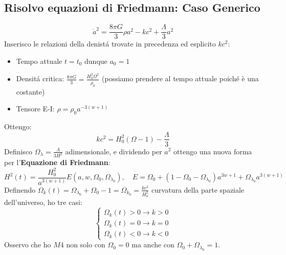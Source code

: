 \documentclass[12pt, a4paper]{article}
\begin{document}
\subsection{Risolvo equazioni di Friedmann: Caso Generico}
\begin{equation}
    \dot{a}^2 = \frac{8 \pi G}{3} \rho a^2 - kc^2 + \frac{\Lambda}{3} a^2
\end{equation}
Inserisco le relazioni della denist\'{a} trovate in precedenza ed esplicito $kc^2$:
\begin{itemize}
    \item Tempo attuale $t=t_0$ dunque $a_0=1$
    \item Densit\'{a} critica: $\frac{8 \pi G}{3}=\frac{H_0^2 \Omega^2}{\rho_0}$ (possiamo prendere al tempo attuale poich\'{e} è una costante)
    \item Tensore E-I: $\rho=\rho_0 a^{-3(w+1)}$
\end{itemize}
Ottengo:
\begin{equation}
    kc^2=H_0^2(\Omega - 1)-\frac{\Lambda}{3}
\end{equation}
Definisco $\Omega_{\lambda}=\frac{\Lambda}{3 H^2}$ adimensionale, e dividendo per $a^2$ ottengo una nuova forma per l'\textbf{Equazione di Friedmann}:
\begin{equation}
    H^2(t)=\frac{H_0^2}{a^{3(w+1)}}E(a,w,\Omega_0, \Omega_{\lambda_0}), \quad E=\Omega_0+(1-\Omega_0-\Omega_{\lambda_0})a^{3w+1}+\Omega_{\lambda_0}a^{3(w+1)}
\end{equation}
Definendo $\Omega_k(t)=\Omega_{\lambda_0} + \Omega_0 -1=\Omega_{k_0}=\frac{kc^2}{H_0^2}$ curvatura della parte spaziale dell'universo, ho tre casi:
\begin{equation}
  \begin{cases}
         \Omega_k(t)>0 \rightarrow k>0
         \\
         \Omega_k(t)=0 \rightarrow k=0
         \\
         \Omega_k(t)<0 \rightarrow k<0
    \end{cases}
\end{equation}
Osservo che ho $M4$ non solo con $\Omega_0=0$ ma anche con $\Omega_0+\Omega_{\lambda_0}=1$.
\end{document}
